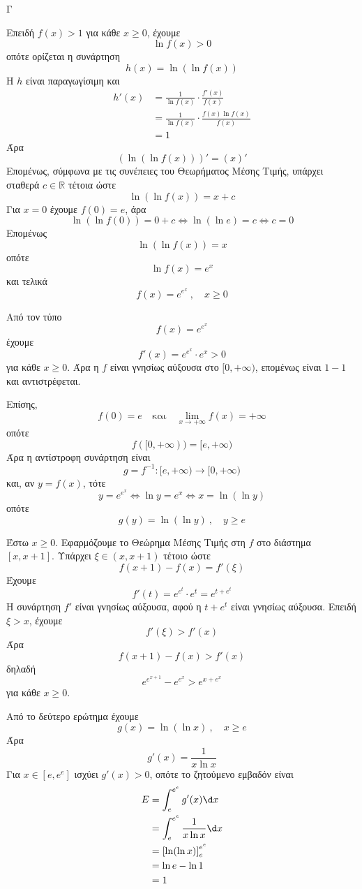 \begin{thema}{Γ}
\begin{erwthma}
\item Επειδή $f(x)>1$ για κάθε $x\geq 0$, έχουμε
\[
\ln f(x)>0
\]
οπότε ορίζεται η συνάρτηση
\[
h(x)=\ln(\ln f(x))
\]
Η $h$ είναι παραγωγίσιμη και
\begin{align*}
h'(x)
&=\frac{1}{\ln f(x)}\cdot \frac{f'(x)}{f(x)}\\
&=\frac{1}{\ln f(x)}\cdot \frac{f(x)\ln f(x)}{f(x)}\\
&=1
\end{align*}
Άρα
\[
\left(\ln(\ln f(x))\right)'=(x)'
\]
Επομένως, σύμφωνα με τις συνέπειες του Θεωρήματος Μέσης Τιμής, υπάρχει σταθερά $c\in\mathbb{R}$ τέτοια ώστε
\[
\ln(\ln f(x))=x+c
\]
Για $x=0$ έχουμε $f(0)=e$, άρα
\[
\ln(\ln f(0))=0+c
\Leftrightarrow
\ln(\ln e)=c
\Leftrightarrow
c=0
\]
Επομένως
\[
\ln(\ln f(x))=x
\]
οπότε
\[
\ln f(x)=e^x
\]
και τελικά
\[
f(x)=e^{e^x}\ ,\quad x\geq 0
\]

\item Από τον τύπο
\[
f(x)=e^{e^x}
\]
έχουμε
\[
f'(x)=e^{e^x}\cdot e^x>0
\]
για κάθε $x\geq 0$.
Άρα η $f$ είναι γνησίως αύξουσα στο $[0,+\infty)$, επομένως είναι $1-1$ και αντιστρέφεται.

Επίσης,
\[
f(0)=e
\quad \text{και}\quad
\lim\limits_{x\to+\infty}f(x)=+\infty
\]
οπότε
\[
f([0,+\infty))=[e,+\infty)
\]
Άρα η αντίστροφη συνάρτηση είναι
\[
g=f^{-1}:[e,+\infty)\to[0,+\infty)
\]
και, αν $y=f(x)$, τότε
\[
y=e^{e^x}
\Leftrightarrow \ln y=e^x
\Leftrightarrow x=\ln(\ln y)
\]
οπότε
\[
g(y)=\ln(\ln y)\ ,\quad y\geq e
\]

\item Έστω $x\geq 0$.
Εφαρμόζουμε το Θεώρημα Μέσης Τιμής στη $f$ στο διάστημα $[x,x+1]$.
Υπάρχει $\xi\in(x,x+1)$ τέτοιο ώστε
\[
f(x+1)-f(x)=f'(\xi)
\]
Έχουμε
\[
f'(t)=e^{e^t}\cdot e^t=e^{t+e^t}
\]
Η συνάρτηση $f'$ είναι γνησίως αύξουσα, αφού η $t+e^t$ είναι γνησίως αύξουσα.
Επειδή $\xi>x$, έχουμε
\[
f'(\xi)>f'(x)
\]
Άρα
\[
f(x+1)-f(x)>f'(x)
\]
δηλαδή
\[
e^{e^{x+1}}-e^{e^x}>e^{x+e^x}
\]
για κάθε $x\geq 0$.

\item Από το δεύτερο ερώτημα έχουμε
\[
g(x)=\ln(\ln x)\ ,\quad x\geq e
\]
Άρα
\[
g'(x)=\frac{1}{x\ln x}
\]
Για $x\in[e,e^e]$ ισχύει $g'(x)>0$, οπότε το ζητούμενο εμβαδόν είναι
\begin{align*}
E&=\dint_e^{e^e}g'(x)\d x\\
&=\dint_e^{e^e}\frac{1}{x\ln x}\d x\\
&=\left[\ln(\ln x)\right]_e^{e^e}\\
&=\ln e-\ln 1\\
&=1
\end{align*}
\end{erwthma}
\end{thema}


